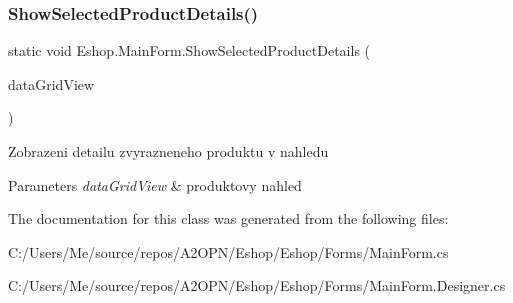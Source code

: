 \subsubsection{\texorpdfstring{ShowSelectedProductDetails()}{ShowSelectedProductDetails()}}
{\footnotesize\ttfamily static void Eshop.\+Main\+Form.\+Show\+Selected\+Product\+Details (\begin{DoxyParamCaption}\item[{Data\+Grid\+View}]{data\+Grid\+View }\end{DoxyParamCaption})\hspace{0.3cm}{\ttfamily [static]}}



Zobrazeni detailu zvyrazneneho produktu v nahledu 


\begin{DoxyParams}{Parameters}
{\em data\+Grid\+View} & produktovy nahled\\
\hline
\end{DoxyParams}


The documentation for this class was generated from the following files\+:\begin{DoxyCompactItemize}
\item 
C\+:/\+Users/\+Me/source/repos/\+A2\+O\+P\+N/\+Eshop/\+Eshop/\+Forms/Main\+Form.\+cs\item 
C\+:/\+Users/\+Me/source/repos/\+A2\+O\+P\+N/\+Eshop/\+Eshop/\+Forms/Main\+Form.\+Designer.\+cs\end{DoxyCompactItemize}
